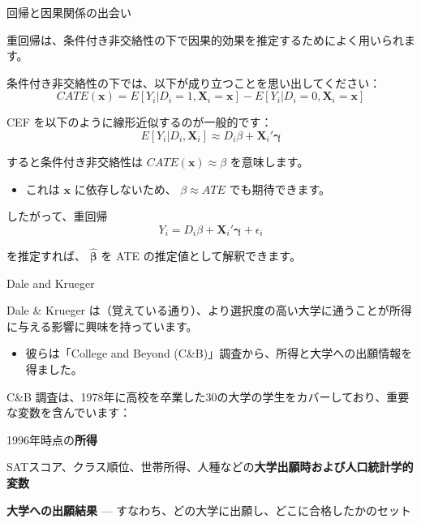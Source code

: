\documentclass[11pt,handout]{beamer}
\newenvironment{wideitemize}{\itemize\addtolength{\itemsep}{10pt}}{\enditemize}
\begin{document}
	\begin{frame}{回帰と因果関係の出会い} 
	
\vspace{0.2cm}
	\begin{wideitemize}
		\item
		重回帰は、条件付き非交絡性の下で因果的効果を推定するためによく用いられます。
		
		\pause
		\item
		条件付き非交絡性の下では、以下が成り立つことを思い出してください：
		$$CATE(\bm{x}) = E[ Y_{i}  | D_i =1, \bm{X}_i = \bm{x} ] - E[Y_{i} | D_i =0 , \bm{X}_i =\bm{x}]  $$
		
		\pause
		\item
		CEF を以下のように線形近似するのが一般的です：
		$$E[ Y_i | D_i, \bm{X}_i  ] \approx D_i  \beta +  \bm{X}_i' \bm{\gamma} $$ 
		
		\pause
		\item
		すると条件付き非交絡性は $CATE(\bm{x}) \approx \beta$ を意味します。 \smallskip
		\begin{itemize}
		\item これは $\mathbf{x}$ に依存しないため、 $\beta \approx ATE$ でも期待できます。
		\end{itemize}
		
		\pause
		\item
		したがって、重回帰
		$$Y_i = D_i \beta + \bm{X}_i' \bm{\gamma} + \epsilon_i$$
		
		\noindent を推定すれば、 $\bm{\hat\beta}$ を ATE の推定値として解釈できます。
	\end{wideitemize}
	
\end{frame}




\begin{frame}{Dale and Krueger} 
		\begin{wideitemize}
			\item
			Dale \& Krueger は（覚えている通り）、より選択度の高い大学に通うことが所得に与える影響に興味を持っています。 \smallskip
			\begin{itemize}
			\item
			彼らは「College and Beyond (C\&B)」調査から、所得と大学への出願情報を得ました。
			\end{itemize}
			\pause
			\item
			C\&B 調査は、1978年に高校を卒業した30の大学の学生をカバーしており、重要な変数を含んでいます：
			
			\pause
			\item
			1996年時点の\textbf{所得}
			
			\item
			SATスコア、クラス順位、世帯所得、人種などの\textbf{大学出願時および人口統計学的変数}
			
			\item
			\textbf{大学への出願結果} --- すなわち、どの大学に出願し、どこに合格したかのセット
				
		\end{wideitemize}	
\end{frame}
\end{document}
